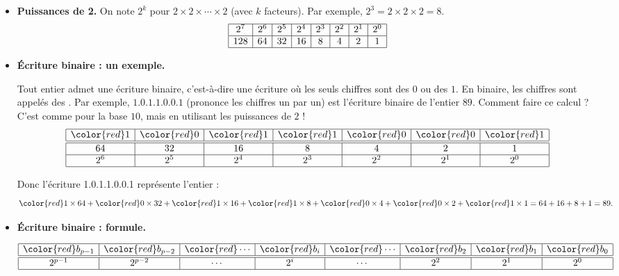 \documentclass[11pt,class=report,crop=false]{standalone}
\begin{document}
\begin{cours}[Binaire]
\sauteligne
\begin{itemize}
  \item \textbf{Puissances de 2.}
    On note $2^k$ pour $2 \times 2 \times \cdots \times 2$ (avec $k$ facteurs). Par exemple, $2^3 = 2 \times 2 \times 2 = 8$. 
$$
\begin{array}{|c|c|c|c|c|c|c|c|}
  \hline
  2^7  & 2^6 & 2^5 & 2^4 & 2^3 & 2^2 & 2^1 & 2^0 \\
  \hline
  128 & 64 & 32 & 16 & 8 & 4 & 2 & 1 \\ 
  \hline
\end{array}
$$

  \item \textbf{\'Ecriture binaire : un exemple.}
  
    Tout entier admet une écriture binaire, c'est-à-dire une écriture où les seuls chiffres sont des $0$ ou des $1$. En binaire, les chiffres sont appelés des .
     Par exemple, $1.0.1.1.0.0.1$ (prononce les chiffres un par un) est l'écriture binaire de l'entier $89$. Comment faire ce calcul ? C'est comme pour la base $10$, mais en utilisant les puissances de $2$ ! 
$$
\begin{array}{|c|c|c|c|c|c|c|}
  \hline
  {\color{red}1} & {\color{red}0} & {\color{red}1} & {\color{red}1} & {\color{red}0} & {\color{red}0} & {\color{red}1} \\ 
  \hline\hline
  64 & 32 & 16  & 8 & 4 & 2 & 1 \\\hline
  2^6 & 2^5 & 2^4 & 2^3 & 2^2 & 2^1 & 2^0 \\
  \hline
\end{array}
$$


    Donc l'écriture {\color{red}1}.{\color{red}0}.{\color{red}1}.{\color{red}1}.{\color{red}0}.{\color{red}0}.{\color{red}1} représente l'entier : 
    $${\color{red}1} \times 64  + {\color{red}0} \times 32 + {\color{red}1} \times 16  + {\color{red}1} \times 8 + {\color{red}0} \times 4 + {\color{red}0} \times 2 + {\color{red}1} \times 1 = 64 + 16 + 8 + 1 = 89.$$
   \item \textbf{\'Ecriture binaire : formule.} 
 
 
  $$
\begin{array}{|c|c|c|c|c|c|c|c|}
  \hline
  {\color{red}b_{p-1}} & {\color{red}b_{p-2}}& {\color{red}\cdots} & {\color{red}b_i}& {\color{red}\cdots} & {\color{red}b_2} & {\color{red}b_1} & {\color{red}b_0} \\ 
  \hline\hline
  2^{p-1} & 2^{p-2} & \cdots & 2^i &\cdots & 2^2 & 2^1 & 2^0 \\
  \hline
\end{array}
$$   
  

\end{itemize}
\end{cours}
\end{document}
